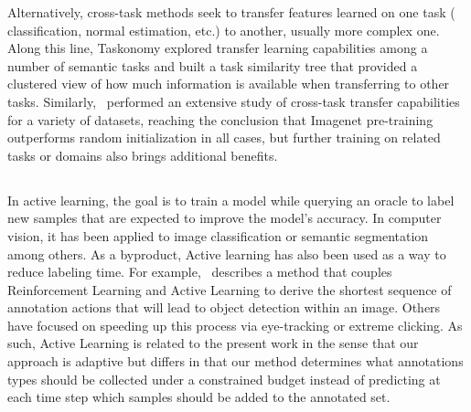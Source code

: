Alternatively, cross-task methods seek to transfer features learned on one task (\eg~ classification, normal estimation, etc.) to another, usually more complex one. Along this line, Taskonomy explored transfer learning capabilities among a number of semantic tasks and built a task similarity tree that provided a clustered view of how much information is available when transferring to other tasks. Similarly,~ performed an extensive study of cross-task transfer capabilities for a variety of datasets, reaching the conclusion that Imagenet pre-training outperforms random initialization in all cases, but further training on related tasks or domains also brings additional benefits.

\subsection{}
In active learning, the goal is to train a model while querying an oracle to label new samples that are expected to improve the model's accuracy. In computer vision, it has been applied to image classification or semantic segmentation among others. As a byproduct, Active learning has also been used as a way to reduce labeling time. For example,~ describes a method that couples Reinforcement Learning and Active Learning to derive the shortest sequence of annotation actions that will lead to object detection within an image. Others have focused on speeding up this process via eye-tracking or extreme clicking. As such, Active Learning is related to the present work in the sense that our approach is adaptive but differs in that our method determines what annotations types should be collected under a constrained budget instead of predicting at each time step which samples should be added to the annotated set.